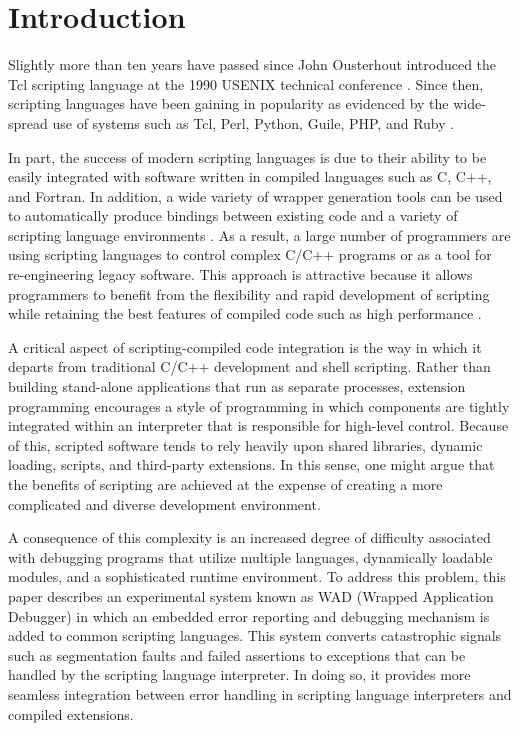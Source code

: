\section{Introduction}

Slightly more than ten years have passed since John Ousterhout
introduced the Tcl scripting language at the 1990 USENIX technical
conference \cite{ousterhout}.  Since then, scripting languages have
been gaining in popularity as evidenced by the wide-spread use of
systems such as Tcl, Perl, Python, Guile, PHP, and Ruby
\cite{ousterhout,perl,python,guile,php,ruby}.

In part, the success of modern scripting languages is due to their
ability to be easily integrated with software written in compiled
languages such as C, C++, and Fortran.  In addition, a wide variety of wrapper
generation tools can be used
to automatically produce bindings between existing code and a
variety of scripting language environments
\cite{swig,sip,pyfort,f2py,advperl,heidrich,vtk,gwrap,wrappy}.  As a result, a large number of
programmers are using scripting languages to control
complex C/C++ programs or as a tool for re-engineering legacy
software.  This approach is attractive because it allows programmers
to benefit from the flexibility and rapid development of
scripting while retaining the best features of compiled code such as high
performance \cite{ouster1}.

A critical aspect of scripting-compiled code integration is the way in
which it departs from traditional C/C++ development and shell
scripting.  Rather than building stand-alone applications that run as
separate processes, extension programming encourages a style of
programming in which components are tightly integrated within 
an interpreter that is responsible for high-level control.
Because of this, scripted software tends to rely heavily
upon shared libraries, dynamic loading, scripts, and
third-party extensions. In this sense, one might argue that the
benefits of scripting are achieved at the expense of creating a
more complicated and diverse development environment.

A consequence of this complexity is an increased degree of difficulty
associated with debugging programs that utilize multiple languages,
dynamically loadable modules, and a sophisticated runtime environment.
To address this problem, this paper describes an experimental system
known as WAD (Wrapped Application Debugger) in which an embedded error
reporting and debugging mechanism is added to common scripting
languages.  This system converts catastrophic signals such as
segmentation faults and failed assertions to exceptions that can be
handled by the scripting language interpreter.  In doing so, it
provides more seamless integration between error handling in
scripting language interpreters and compiled extensions. 

